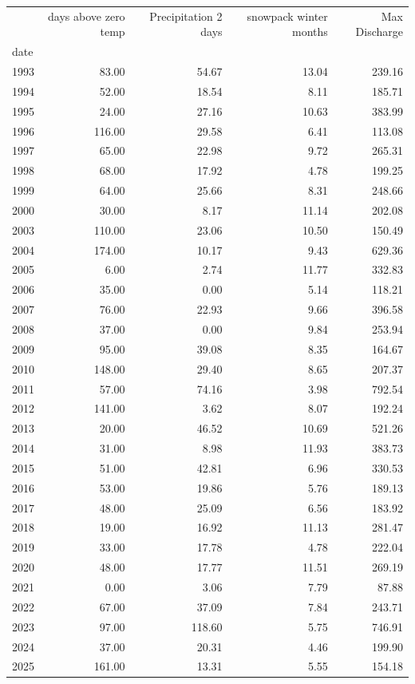\begin{tabular}{lrrrr}
\toprule
 & days above zero temp & Precipitation 2 days & snowpack winter months & Max Discharge \\
date &  &  &  &  \\
\midrule
1993 & 83.00 & 54.67 & 13.04 & 239.16 \\
1994 & 52.00 & 18.54 & 8.11 & 185.71 \\
1995 & 24.00 & 27.16 & 10.63 & 383.99 \\
1996 & 116.00 & 29.58 & 6.41 & 113.08 \\
1997 & 65.00 & 22.98 & 9.72 & 265.31 \\
1998 & 68.00 & 17.92 & 4.78 & 199.25 \\
1999 & 64.00 & 25.66 & 8.31 & 248.66 \\
2000 & 30.00 & 8.17 & 11.14 & 202.08 \\
2003 & 110.00 & 23.06 & 10.50 & 150.49 \\
2004 & 174.00 & 10.17 & 9.43 & 629.36 \\
2005 & 6.00 & 2.74 & 11.77 & 332.83 \\
2006 & 35.00 & 0.00 & 5.14 & 118.21 \\
2007 & 76.00 & 22.93 & 9.66 & 396.58 \\
2008 & 37.00 & 0.00 & 9.84 & 253.94 \\
2009 & 95.00 & 39.08 & 8.35 & 164.67 \\
2010 & 148.00 & 29.40 & 8.65 & 207.37 \\
2011 & 57.00 & 74.16 & 3.98 & 792.54 \\
2012 & 141.00 & 3.62 & 8.07 & 192.24 \\
2013 & 20.00 & 46.52 & 10.69 & 521.26 \\
2014 & 31.00 & 8.98 & 11.93 & 383.73 \\
2015 & 51.00 & 42.81 & 6.96 & 330.53 \\
2016 & 53.00 & 19.86 & 5.76 & 189.13 \\
2017 & 48.00 & 25.09 & 6.56 & 183.92 \\
2018 & 19.00 & 16.92 & 11.13 & 281.47 \\
2019 & 33.00 & 17.78 & 4.78 & 222.04 \\
2020 & 48.00 & 17.77 & 11.51 & 269.19 \\
2021 & 0.00 & 3.06 & 7.79 & 87.88 \\
2022 & 67.00 & 37.09 & 7.84 & 243.71 \\
2023 & 97.00 & 118.60 & 5.75 & 746.91 \\
2024 & 37.00 & 20.31 & 4.46 & 199.90 \\
2025 & 161.00 & 13.31 & 5.55 & 154.18 \\
\bottomrule
\end{tabular}
